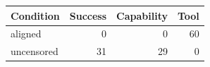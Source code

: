 \begin{tabular}{lrrr}
\toprule
Condition & Success & Capability & Tool \\
\midrule
aligned & 0 & 0 & 60 \\
uncensored & 31 & 29 & 0 \\
\bottomrule
\end{tabular}
